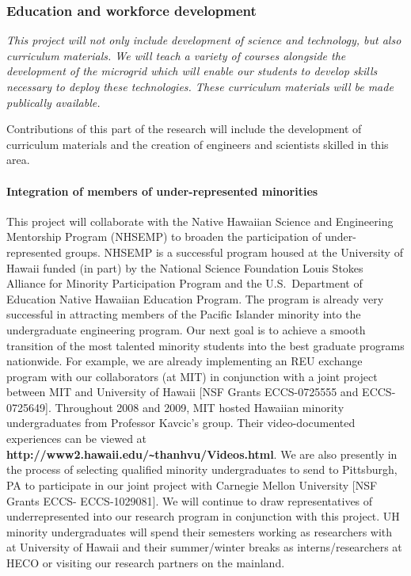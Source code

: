 
\subsubsection{Education and workforce development}

{\em This project will not only include development of science and
  technology, but also curriculum materials. We will teach a variety of
  courses alongside the development of the microgrid which will enable our
  students to develop skills necessary to deploy these technologies. These
  curriculum materials will be made publically available.

  Contributions of this part of the research will include the development of curriculum
  materials and the creation of engineers and scientists skilled in this
  area.}

\paragraph{Integration of members of under-represented minorities}

This project will collaborate with the Native Hawaiian Science and
Engineering Mentorship Program (NHSEMP) to broaden the participation of
under-represented groups. NHSEMP is a successful program housed at the
University of Hawaii funded (in part) by the National Science Foundation
Louis Stokes Alliance for Minority Participation Program and the
U.S.~Department of Education Native Hawaiian Education Program. The program
is already very successful in attracting members of the Pacific Islander
minority into the undergraduate engineering program. Our next goal is to
achieve a smooth transition of the most talented minority students into the
best graduate programs nationwide. For example, we are already implementing
an REU exchange program with our collaborators (at MIT) in conjunction with
a joint project between MIT and University of Hawaii [NSF Grants
ECCS-0725555 and ECCS-0725649]. Throughout 2008 and 2009, MIT hosted
Hawaiian minority undergraduates from Professor Kavcic's group. Their
video-documented experiences can be viewed at {\bf
  http://www2.hawaii.edu/\verb+~+thanhvu/Videos.html}. We are also
presently in the process of selecting qualified minority undergraduates to
send to Pittsburgh, PA to participate in our joint project with Carnegie
Mellon University [NSF Grants ECCS- ECCS-1029081]. We will continue to draw
representatives of underrepresented into our research program in
conjunction with this project. UH minority undergraduates will spend their
semesters working as researchers with at University of Hawaii and their
summer/winter breaks as interns/researchers at HECO or visiting our
research partners on the mainland.

